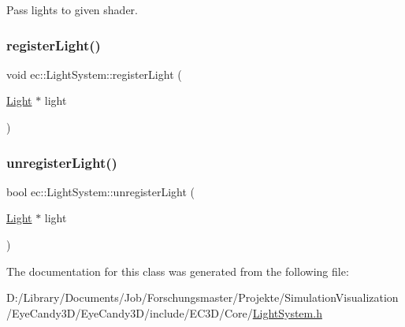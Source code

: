 Pass lights to given shader. \mbox{\label{classec_1_1_light_system_aedb1b50a5920e42732e53f8eb8a5410d}} 
\subsubsection{\texorpdfstring{register\+Light()}{registerLight()}}
{\footnotesize\ttfamily void ec\+::\+Light\+System\+::register\+Light (\begin{DoxyParamCaption}\item[{\mbox{\hyperlink{classec_1_1_light}{Light}} $\ast$}]{light }\end{DoxyParamCaption})}

\mbox{\label{classec_1_1_light_system_ab1bd930134d6305a5666a165fc41d0f5}} 
\subsubsection{\texorpdfstring{unregister\+Light()}{unregisterLight()}}
{\footnotesize\ttfamily bool ec\+::\+Light\+System\+::unregister\+Light (\begin{DoxyParamCaption}\item[{\mbox{\hyperlink{classec_1_1_light}{Light}} $\ast$}]{light }\end{DoxyParamCaption})}



The documentation for this class was generated from the following file\+:\begin{DoxyCompactItemize}
\item 
D\+:/\+Library/\+Documents/\+Job/\+Forschungsmaster/\+Projekte/\+Simulation\+Visualization/\+Eye\+Candy3\+D/\+Eye\+Candy3\+D/include/\+E\+C3\+D/\+Core/\mbox{\hyperlink{_light_system_8h}{Light\+System.\+h}}\end{DoxyCompactItemize}
